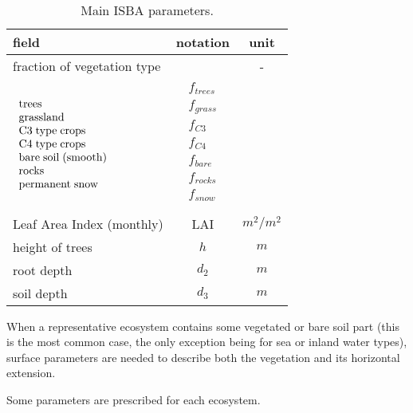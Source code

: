 \begin{table}[h]
\hspace*{4.cm}
\begin{tabular}{||l|c|c||}
\hline
\hline
field & notation & unit \\
\hline
\hline
fraction of vegetation type &  & - \\
\hspace*{1.cm}$\begin{array}{l}
{\rm trees}\\
{\rm grassland}\\
{\rm C3 \; type \; crops}\\
{\rm C4 \; type \; crops}\\
{\rm bare \;  soil \; (smooth)}\\
{\rm rocks} \\
{\rm permanent  \; snow} \\
\end{array} $ &
$\begin{array}{l}
f_{trees}\\
f_{grass}\\
f_{C3}\\
f_{C4}\\
f_{bare}\\
f_{rocks} \\
f_{snow} \\
\end{array}$
&  \\
\hline
Leaf Area Index (monthly)   & LAI       &  $m^2/m^2$ \\
\hline
height of trees & $h$ &  $m$ \\
\hline
 root depth & $d_2$ & $m$ \\
\hline
 soil depth & $d_3$ &$m$ \\
\hline
\hline
\end{tabular}
\caption{Main ISBA parameters.
\label{paramISBA1}}
\end{table}

When a representative ecosystem contains some vegetated or bare soil part
(this is the most common case, the only exception
being for sea or inland water types), surface parameters are needed
to describe both the vegetation and its horizontal extension.

Some parameters are prescribed for each ecosystem.

